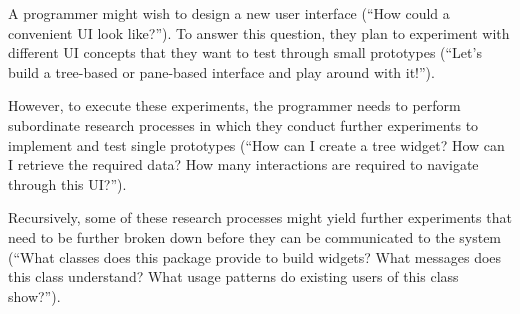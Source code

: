 \begin{example}
	A programmer might wish to design a new user interface (``How could a convenient UI look like?'').
	To answer this question, they plan to experiment with different UI concepts that they want to test through small prototypes (``Let's build a tree-based or pane-based interface and play around with it!'').

	However, to execute these experiments, the programmer needs to perform subordinate research processes in which they conduct further experiments to implement and test single prototypes (``How can I create a tree widget? How can I retrieve the required data? How many interactions are required to navigate through this UI?'').

	Recursively, some of these research processes might yield further experiments that need to be further broken down before they can be communicated to the system (``What classes does this package provide to build widgets? What messages does this class understand? What usage patterns do existing users of this class show?'').
\end{example}
